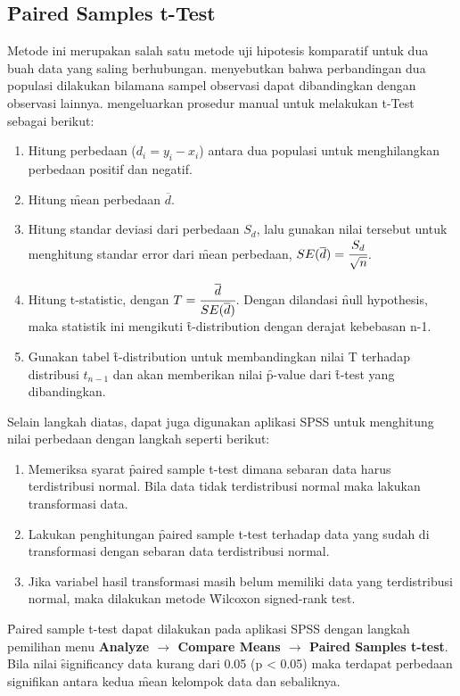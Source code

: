 \subsection{\f{Paired Samples t-Test}}
Metode ini merupakan salah satu metode uji hipotesis komparatif untuk dua buah data yang saling berhubungan. \citet{article.shier} menyebutkan bahwa perbandingan dua populasi dilakukan bilamana sampel observasi dapat dibandingkan dengan observasi lainnya. \citeauthor{article.shier} mengeluarkan prosedur manual untuk melakukan t-Test sebagai berikut:
\begin{enumerate}
	\item Hitung perbedaan ($d_{i} = y_{i}-x_{i}$) antara dua populasi untuk menghilangkan perbedaan positif dan negatif.
	\item Hitung \f{mean} perbedaan $\overline{d}$.
	\item Hitung standar deviasi dari perbedaan $S_{d}$, lalu gunakan nilai tersebut untuk menghitung standar error dari \f{mean} perbedaan, $SE(\overline{d}) = \cfrac{S_{d}}{\sqrt{n}}$.
	\item Hitung t-statistic, dengan $T = \cfrac{\overline{d}}{SE(\overline{d})}$. Dengan dilandasi \f{null hypothesis}, maka statistik ini mengikuti \f{t-distribution} dengan derajat kebebasan n-1.
	\item Gunakan tabel \f{t-distribution} untuk membandingkan nilai T terhadap distribusi $t_{n-1}$ dan akan memberikan nilai \f{p-value} dari \f{t-test} yang dibandingkan.
\end{enumerate}
Selain langkah diatas, dapat juga digunakan aplikasi SPSS untuk menghitung nilai perbedaan dengan langkah seperti berikut:
\begin{enumerate}
	\item Memeriksa syarat \f{paired sample t-test} dimana sebaran data harus terdistribusi normal. Bila data tidak terdistribusi normal maka lakukan transformasi data.
	\item Lakukan penghitungan \f{paired sample t-test} terhadap data yang sudah di transformasi dengan sebaran data terdistribusi normal.
	\item Jika variabel hasil transformasi masih belum memiliki data yang terdistribusi normal, maka dilakukan metode \f{Wilcoxon signed-rank test}.
\end{enumerate}
\f{Paired sample t-test} dapat dilakukan pada aplikasi SPSS dengan langkah pemilihan menu \textbf{Analyze $\rightarrow$ Compare Means $\rightarrow$ Paired Samples t-test}. Bila nilai \f{significancy} data kurang dari 0.05 (p < 0.05) maka terdapat perbedaan signifikan antara kedua \f{mean} kelompok data dan sebaliknya.
